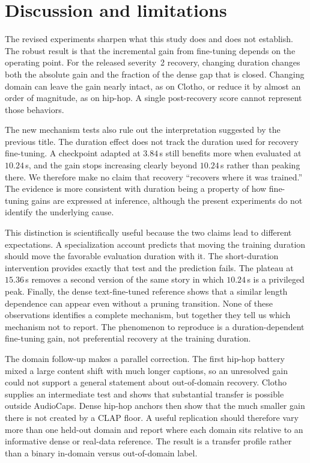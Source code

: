 \section{Discussion and limitations}
The revised experiments sharpen what this study does and does not establish. The robust result is that the incremental gain from fine-tuning depends on the operating point. For the released severity~2 recovery, changing duration changes both the absolute gain and the fraction of the dense gap that is closed. Changing domain can leave the gain nearly intact, as on Clotho, or reduce it by almost an order of magnitude, as on hip-hop. A single post-recovery score cannot represent those behaviors.

The new mechanism tests also rule out the interpretation suggested by the previous title. The duration effect does not track the duration used for recovery fine-tuning. A checkpoint adapted at $3.84$\,s still benefits more when evaluated at $10.24$\,s, and the gain stops increasing clearly beyond $10.24$\,s rather than peaking there. We therefore make no claim that recovery ``recovers where it was trained.'' The evidence is more consistent with duration being a property of how fine-tuning gains are expressed at inference, although the present experiments do not identify the underlying cause.

This distinction is scientifically useful because the two claims lead to different expectations. A specialization account predicts that moving the training duration should move the favorable evaluation duration with it. The short-duration intervention provides exactly that test and the prediction fails. The plateau at $15.36$\,s removes a second version of the same story in which $10.24$\,s is a privileged peak. Finally, the dense text-fine-tuned reference shows that a similar length dependence can appear even without a pruning transition. None of these observations identifies a complete mechanism, but together they tell us which mechanism not to report. The phenomenon to reproduce is a duration-dependent fine-tuning gain, not preferential recovery at the training duration.

The domain follow-up makes a parallel correction. The first hip-hop battery mixed a large content shift with much longer captions, so an unresolved gain could not support a general statement about out-of-domain recovery. Clotho supplies an intermediate test and shows that substantial transfer is possible outside AudioCaps. Dense hip-hop anchors then show that the much smaller gain there is not created by a CLAP floor. A useful replication should therefore vary more than one held-out domain and report where each domain sits relative to an informative dense or real-data reference. The result is a transfer profile rather than a binary in-domain versus out-of-domain label.

